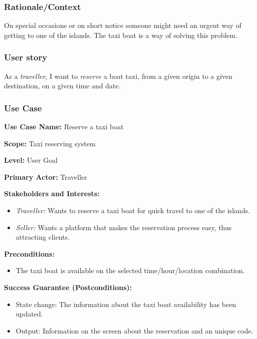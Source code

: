 \subsubsection{Rationale/Context}
On special occasions or on short notice someone might need an urgent way of getting to one of  the islands. The taxi boat is a way of solving this problem.
\subsubsection{User story}
As a \textit{traveller}, I want to \textit{reserve} a boat taxi, from a given origin to a given destination, on a given time and date.
\subsubsection{Use Case}
\creator{\studentA}

\textbf{Use Case Name:} Reserve a taxi boat

\textbf{Scope:} Taxi reserving system

\textbf{Level:} User Goal

\textbf{Primary Actor:} Traveller

\textbf{Stakeholders and Interests:} 
\begin{itemize}
\item \textit{Traveller:} Wants to reserve a taxi boat for quick travel to one of the islands.
\item \textit{Seller:} Wants a platform that makes the reservation process easy, thus attracting clients.
\end{itemize}

\textbf{Preconditions:}
\begin{itemize}
\item The taxi boat is available on the selected time/hour/location combination.
\end{itemize}

\textbf{Success Guarantee (Postconditions):}
\begin{itemize}
    \item State change: The information about the taxi boat availability has been updated.
    \item Output: Information on the screen about the reservation and an unique code.
\end{itemize}

